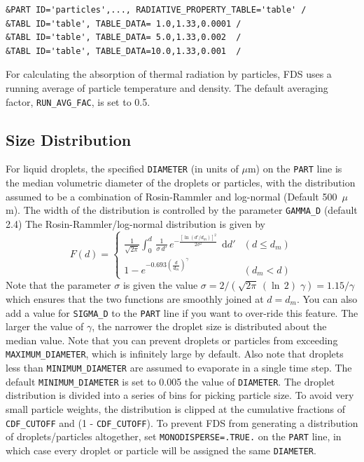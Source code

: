 \documentclass[11pt]{book}
\newcommand{\ct}{\tt\small}
\renewcommand{\d}{\,\mathrm{d}}
\newcommand{\be}{\begin{equation}}
\newcommand{\ee}{\end{equation}}
\begin{document}
\footnotesize
\begin{verbatim}
&PART ID='particles',..., RADIATIVE_PROPERTY_TABLE='table' /
&TABL ID='table', TABLE_DATA= 1.0,1.33,0.0001 /
&TABL ID='table', TABLE_DATA= 5.0,1.33,0.002  /
&TABL ID='table', TABLE_DATA=10.0,1.33,0.001  /
\end{verbatim} \normalsize
\normalsize

\noindent
For calculating the absorption of thermal radiation by particles, FDS uses a running average of particle temperature and density. The default averaging factor, {\ct RUN\_AVG\_FAC}, is set to 0.5.


\subsection{Size Distribution}
\label{info:particle_size}

For liquid droplets, the specified {\ct DIAMETER} (in units of $\mu$m) on the {\ct PART} line is the median volumetric diameter of the droplets or particles, with the
distribution assumed to be a combination of Rosin-Rammler and log-normal (Default 500~$\mu$m). The
width of the distribution is controlled by the parameter {\ct GAMMA\_D} (default 2.4)
The Rosin-Rammler/log-normal distribution is given by
\be F(d) = \left\{ \begin{array}{ll}
   \frac{1}{\sqrt{2\pi}} {\displaystyle \int_0^d} \, \frac{1}{\sigma\, d'} \,
   e^{-\frac{[\ln(d'/d_m)]^2}{2\sigma^2}} \; \d d'       & (d \le d_m) \\
   1 - e^{-0.693 \left(\frac{d}{d_m}\right)^\gamma }  & (d_m < d)
   \end{array} \right.
\ee
Note that the parameter $\sigma$ is given the value
$\sigma=2/(\sqrt{2\pi} \, (\ln\,2) \; \gamma)=1.15/\gamma$
which ensures that the two functions are smoothly joined at $d=d_m$. You can also add a value for {\ct SIGMA\_D} to the {\ct PART} line if you want to
over-ride this feature.
The larger the value of $\gamma$, the narrower the droplet size is
distributed about the median value. Note that you can prevent droplets or particles from
exceeding {\ct MAXIMUM\_DIAMETER}, which is infinitely large by default. Also note that
droplets less than {\ct MINIMUM\_DIAMETER} are assumed to evaporate in a single time step. The default {\ct MINIMUM\_DIAMETER} is set to 0.005 the value of {\ct DIAMETER}.
The droplet distribution is divided into a series of bins for picking particle size.  To avoid very small particle weights, the distribution is clipped at the cumulative
fractions of {\ct CDF\_CUTOFF} and (1 - {\ct CDF\_CUTOFF}).
To prevent FDS from generating a distribution of droplets/particles altogether, set
{\ct MONODISPERSE=.TRUE.} on the {\ct PART} line, in which case every droplet or particle will be assigned the
same {\ct DIAMETER}.
\end{document}
